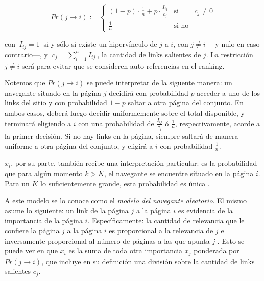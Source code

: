 \vspace{1em}
\begin{equation}
    Pr(j \longrightarrow i) := 
        \left\{ 
            \begin{array}{lcc}
            (1 - p)\cdot \frac{1}{n} + p\cdot \frac{I_{ij}}{c_j}    &  \text{si}    & c_j \neq 0\\
            \frac{1}{n}                                             &  \text{si no} &
            \end{array}
        \right.
\end{equation}

\vspace{1em}
\noindent con $\ I_{ij} = 1\ $ si y sólo si existe un hipervínculo de $j$ a $i$, con $j \neq i$ ---y nulo en caso contrario---, y $\ c_j = \sum_{i=1}^{n}{I_{ij}}\ $, la cantidad de links salientes de $j$. La restricción $j \neq i$ será para evitar que se consideren auto-referencias en el ranking.    

\vspace{1em}
Notemos que $Pr(j \longrightarrow i)$ se puede interpretar de la siguente manera: un navegante situado en la página $j$ decidirá con probabilidad $p$ acceder a uno de los links del sitio y con probabilidad $1 - p$ saltar a otra página del conjunto. En ambos casos, deberá luego decidir uniformemente sobre el total disponible, y terminará eligiendo a $i$ con una probabilidad de $\frac{I_{ij}}{c_j}$ ó $\frac{1}{n}$, respectivamente, acorde a la primer decisión. Si no hay links en la página, siempre saltará de manera uniforme a otra página del conjunto, y eligirá a $i$ con probabilidad $\frac{1}{n}$. 

\vspace{1em}
$x_i$, por su parte, también recibe una interpretación particular: es la probabilidad que para algún momento $k > K$, el navegante se encuentre situado en la página $i$. Para un $K$ lo suficientemente grande, esta probabilidad es única \cite{Kamvar03}. 

\vspace{1em}
A este modelo se lo conoce como el \textit{modelo del navegante aleatorio}. El mismo asume lo siguiente: un link de la página $j$ a la página $i$ es evidencia de la importancia de la página $i$. Específicamente: la cantidad de relevancia que le confiere la página $j$ a la página $i$ es proporcional a la relevancia de $j$ e inversamente proporcional al número de páginas a las que apunta $j$ \cite{Kamvar03}. Esto se puede ver en que $x_i$ es la suma de toda otra importancia $x_j$ ponderada por $Pr(j \longrightarrow i)$, que incluye en su definición una división sobre la cantidad de links salientes $c_j$. 



